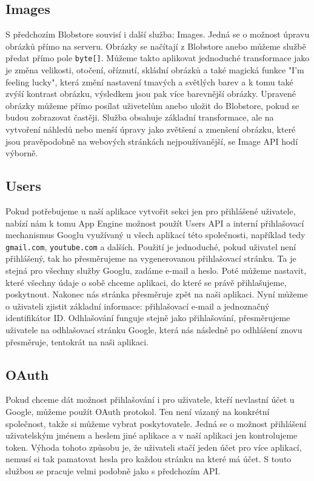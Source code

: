 \subsection{Images}
S předchozím Blobstore souvisí i další služba: Images. Jedná se o možnost úpravu obrázků přímo na serveru. Obrázky se načítají z Blobstore anebo můžeme službě předat přímo pole \verb|byte[]|. Můžeme takto aplikovat jednoduché transformace jako je změna velikosti, otočení, oříznutí, skládní obrázků a také magická funkce "I’m feeling lucky", která změní nastavení tmavých a světlých barev a k tomu také zvýší kontrast obrázku, výsledkem jsou pak více barevnější obrázky. Upravené obrázky můžeme přímo posílat uživetelům anebo uložit do Blobstore, pokud se budou zobrazovat častěji. Služba obsahuje základní transformace, ale na vytvoření náhledů nebo menší úpravy jako zvětšení a zmenšení obrázku, které jsou pravěpodobně na webových stránkách nejpoužívanější, se Image API hodí výborně.

\subsection{Users}
Pokud potřebujeme u naší aplikace vytvořit sekci jen pro přihlášené uživatele, nabízí nám k tomu App Engine možnost použít Users API a interní přihlašovací mechanismus Googlu využívaný u všech aplikací této společnosti, například tedy \verb|gmail.com|, \verb|youtube.com| a dalších. Použití je jednoduché, pokud uživatel není přihlášený, tak ho přesměrujeme na vygenerovanou přihlašovací stránku. Ta je stejná pro všechny služby Googlu, zadáme e-mail a heslo. Poté můžeme nastavit, které všechny údaje o sobě chceme aplikaci, do které se právě přihlašujeme, poskytnout. Nakonec nás stránka přesměruje zpět na naši aplikaci. Nyní můžeme o uživateli zjistit základní informace: přihlašovací e-mail a jednoznačný identifikátor ID. Odhlašování funguje stejně jako přihlašování, přesměrujeme uživatele na odhlašovací stránku Google, která nás následně po odhlášení znovu přesměruje, tentokrát na naši aplikaci.

\subsection{OAuth}
Pokud chceme dát možnost přihlašování i pro uživatele, kteří nevlastní účet u Google, můžeme použít OAuth protokol. Ten není vázaný na konkrétní společnost, takže si můžeme vybrat poskytovatele. Jedná se o možnost přihlášení uživatelským jménem a heslem jiné aplikace a v naší aplikaci jen kontrolujeme token. Výhoda tohoto způsobu je, že uživateli stačí jeden účet pro více aplikací, nemusí si tak pamatovat hesla pro každou stránku na které má účet. S touto službou se pracuje velmi podobně jako s předchozím API.

